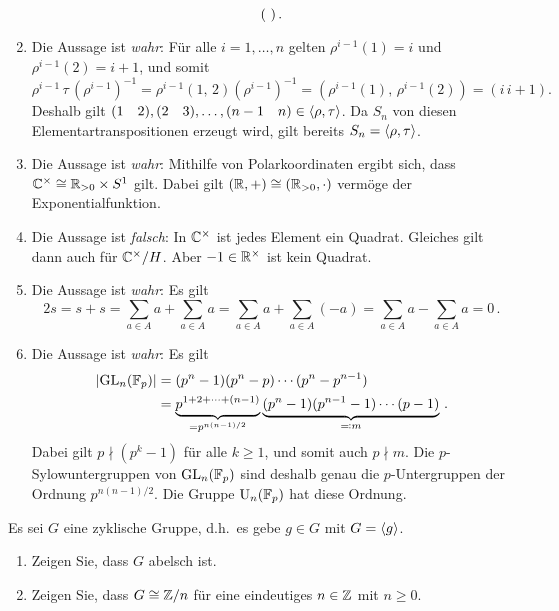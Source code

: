 \begin{solution}
\begin{enumerate}
\[\begin{psmallmatrix}
              \end{psmallmatrix} \,.
      \]
    \item
      Die Aussage ist \emph{wahr}:
      Für alle $i = 1, \dotsc, n$ gelten $\rho^{i-1}(1) = i$ und $\rho^{i-1}(2) = i+1$, und somit
      \[
        \rho^{i-1} \, \tau \, (\rho^{i-1})^{-1}
        = \rho^{i-1} (1,\, 2) (\rho^{i-1})^{-1}
        = (\rho^{i-1}(1),\, \rho^{i-1}(2))
        = (i\, i+1).
      \]
      Deshalb gilt $(1 \quad 2), (2 \quad 3), \dotsc, (n-1 \quad n) \in \langle\rho, \tau\rangle$.
      Da $S_n$ von diesen Elementartranspositionen erzeugt wird, gilt bereits $S_n = \langle\rho, \tau\rangle$.
    \item
      Die Aussage ist \emph{wahr}:
      Mithilfe von Polarkoordinaten ergibt sich, dass $\mathbb{C}^\times \cong \mathbb{R}_{> 0} \times S^1$ gilt.
      Dabei gilt $(\mathbb{R}, +) \cong (\mathbb{R}_{>0}, \cdot)$ vermöge der Exponentialfunktion.
    \item
      Die Aussage ist \emph{falsch}:
      In $\mathbb{C}^\times$ ist jedes Element ein Quadrat.
      Gleiches gilt dann auch für $\mathbb{C}^\times/H$.
      Aber $-1 \in \mathbb{R}^\times$ ist kein Quadrat.
    \item
      Die Aussage ist \emph{wahr}:
      Es gilt
      \[
          2 s
        = s + s
        = \sum_{a \in A} a + \sum_{a \in A} a
        = \sum_{a \in A} a + \sum_{a \in A} (-a)
        = \sum_{a \in A} a - \sum_{a \in A} a
        = 0 \,.
      \]
    \item
      Die Aussage ist \emph{wahr}:
      Es gilt
      \begin{align*}
            |{\operatorname{GL}_n(\mathbb{F}_p)}|
        &=  (p^n - 1)(p^n - p) \dotsm (p^n - p^{n-1}) \\
        &=  \underbrace{p^{1 + 2 + \dotsb + (n-1)}}_{= p^{n(n-1)/2}}
            \underbrace{(p^n - 1)(p^{n-1} - 1) \dotsm (p - 1)}_{\eqqcolon m} \,.
      \end{align*}
      Dabei gilt $p \nmid (p^k - 1)$ für alle $k \geq 1$, und somit auch $p \nmid m$.
      Die $p$-Sylow\-unter\-gruppen von $\operatorname{GL}_n(\mathbb{F}_p)$ sind deshalb genau die $p$-Untergruppen der Ordnung $p^{n(n-1)/2}$.
      Die Gruppe $\operatorname{U}_n(\mathbb{F}_p)$ hat diese Ordnung.
  \end{enumerate}
\end{solution}


\begin{question}[subtitle = Klassifikation zyklischer Gruppen]
  Es sei $G$ eine zyklische Gruppe, d.h.\ es gebe $g \in G$ mit $G = \langle g\rangle$.
  \begin{enumerate}
    \item
      Zeigen Sie, dass $G$ abelsch ist.
    \item
      Zeigen Sie, dass $G \cong \mathbb{Z}/n$ für eine eindeutiges $n \in \mathbb{Z}$ mit $n \geq 0$.
  \end{enumerate}
\end{question}


